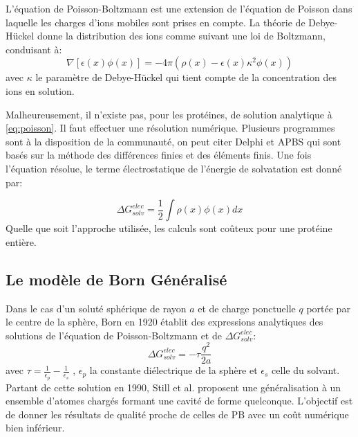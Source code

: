 L'équation de Poisson-Boltzmann est une extension de l'équation de Poisson dans laquelle les charges d'ions mobiles sont prises en compte. La théorie de Debye-Hückel donne la distribution des ions comme suivant une loi de Boltzmann, conduisant à:
\begin{equation}
  \nabla [ \epsilon (x) \phi(x)] = -4 \pi ( \rho(x) - \epsilon(x) \kappa^2 \phi(x))
\end{equation}
avec $ \kappa $ le paramètre de Debye-Hückel qui tient compte de la concentration des ions en solution.

Malheureusement, il n'existe pas, pour les protéines, de solution analytique à \ref{eq:poisson}. Il faut effectuer une résolution numérique. Plusieurs programmes sont à la disposition de la communauté, on peut citer Delphi \cite{Rocchia02} et APBS \cite{Baker01}  qui sont basés sur la méthode des différences finies et des éléments finis. Une fois l'équation résolue, le terme électrostatique de l'énergie de solvatation est donné par:

\begin{equation}
\Delta G_{solv}^{elec} = \frac{1}{2} \int \rho(x)\phi(x)dx  
\end{equation}
Quelle que soit l'approche utilisée, les calculs sont coûteux pour une protéine entière.


\subsection{Le modèle de Born Généralisé}
\label{sub:GB}
Dans le cas d'un soluté sphérique de rayon $a$ et de charge ponctuelle $q$ portée par le centre de la sphère, Born en 1920 \cite{Born20} établit des expressions analytiques des solutions de l'équation de Poisson-Boltzmann et de $ \Delta G_{solv}^{elec}$:
\begin{equation}
  \label{eq:Born}
  \Delta G_{solv}^{elec} = - \tau \frac{q^2}{2a}
\end{equation}
avec $ \tau = \frac{1}{\epsilon_p} - \frac{1}{\epsilon_s}$ , $\epsilon_p$ la constante diélectrique de la sphère et $\epsilon_s$ celle du solvant. Partant de cette solution en 1990, Still et al. \cite{Still90} proposent une généralisation à un ensemble d'atomes chargés formant une cavité de forme quelconque. L'objectif est de donner les résultats de qualité proche de celles de PB avec un coût numérique bien inférieur.

